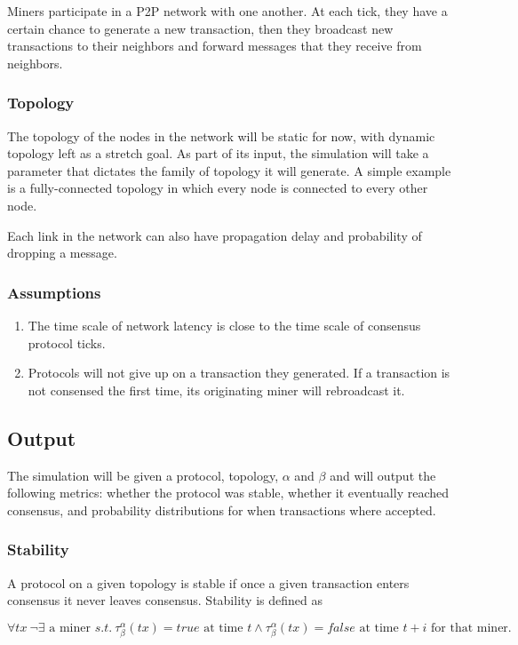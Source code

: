 \documentclass[letterpaper,11pt]{article}
\begin{document}
Miners participate in a P2P network with one another. At each tick, they have a certain chance to generate a new transaction, then they broadcast new transactions to their neighbors and forward messages that they receive from neighbors.

\subsubsection{Topology}
The topology of the nodes in the network will be static for now, with dynamic topology left as a stretch goal. As part of its input, the simulation will take a parameter that dictates the family of topology it will generate. A simple example is a fully-connected topology in which every node is connected to every other node.

Each link in the network can also have propagation delay and probability of dropping a message.

\subsubsection{Assumptions}
\begin{enumerate}
  \item The time scale of network latency is close to the time scale of consensus protocol ticks.
  \item Protocols will not give up on a transaction they generated. If a transaction is not consensed the first time, its originating miner will rebroadcast it.
\end{enumerate}

\subsection{Output}
The simulation will be given a protocol, topology, $\alpha$ and $\beta$ and will output the following metrics: whether the protocol was stable, whether it eventually reached consensus, and probability distributions for when transactions where accepted.

\subsubsection{Stability}
A protocol on a given topology is stable if once a given transaction enters consensus it never leaves consensus. Stability is defined as

\[\forall tx~\neg\exists \textrm{ a miner } s.t.~\tau_\beta^\alpha(tx) = true \textrm{ at time } t \wedge \tau_\beta^\alpha(tx) = false \textrm{ at time } t + i \textrm{ for that miner}.\]
\end{document}
